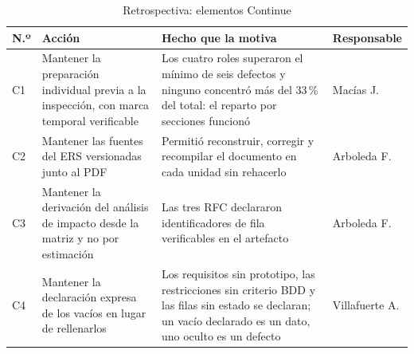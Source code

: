 \begin{table}[H]
\centering\footnotesize
\caption{Retrospectiva: elementos Continue}
\label{tab:continue}
\begin{tabular}{|C{1.2cm}|L{6.4cm}|L{4.4cm}|C{2.4cm}|}
\hline
{}\textbf{N.º} & \textbf{Acción} & \textbf{Hecho que la motiva} & \textbf{Responsable}\\ \hline
C1 & Mantener la preparación individual previa a la inspección, con marca temporal verificable & Los cuatro roles superaron el mínimo de seis defectos y ninguno concentró más del 33\,\% del total: el reparto por secciones funcionó & Macías J.\\ \hline
C2 & Mantener las fuentes del ERS versionadas junto al PDF & Permitió reconstruir, corregir y recompilar el documento en cada unidad sin rehacerlo & Arboleda F.\\ \hline
C3 & Mantener la derivación del análisis de impacto desde la matriz y no por estimación & Las tres RFC declararon identificadores de fila verificables en el artefacto & Arboleda F.\\ \hline
C4 & Mantener la declaración expresa de los vacíos en lugar de rellenarlos & Los requisitos sin prototipo, las restricciones sin criterio BDD y las filas sin estado se declaran; un vacío declarado es un dato, uno oculto es un defecto & Villafuerte A.\\ \hline
\end{tabular}
\end{table}

